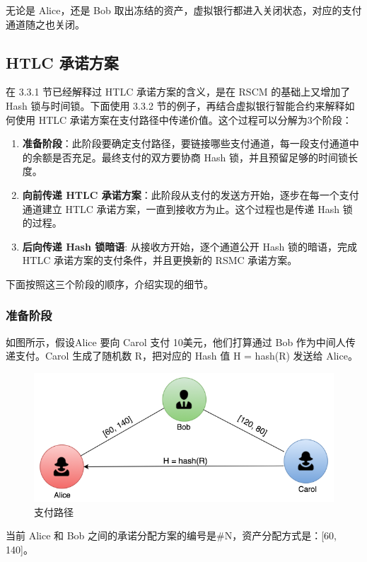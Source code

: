 \begin{appendices}
无论是 Alice，还是 Bob 取出冻结的资产，虚拟银行都进入关闭状态，对应的支付通道随之也关闭。


\subsection{HTLC 承诺方案}
在 3.3.1 节已经解释过 HTLC 承诺方案的含义，是在 RSCM 的基础上又增加了 Hash 锁与时间锁。下面使用 3.3.2 节的例子，再结合虚拟银行智能合约来解释如何使用 HTLC 承诺方案在支付路径中传递价值。这个过程可以分解为3个阶段：
\begin{enumerate}
    \item \textbf{准备阶段}：此阶段要确定支付路径，要链接哪些支付通道，每一段支付通道中的余额是否充足。最终支付的双方要协商 Hash 锁，并且预留足够的时间锁长度。
    \item \textbf{向前传递 HTLC 承诺方案}：此阶段从支付的发送方开始，逐步在每一个支付通道建立 HTLC 承诺方案，一直到接收方为止。这个过程也是传递 Hash 锁的过程。
    \item \textbf{后向传递 Hash 锁暗语}: 从接收方开始，逐个通道公开 Hash 锁的暗语，完成 HTLC 承诺方案的支付条件，并且更换新的 RSMC 承诺方案。
\end{enumerate}

下面按照这三个阶段的顺序，介绍实现的细节。

\subsubsection{准备阶段}

如图所示，假设Alice 要向 Carol 支付 10美元，他们打算通过 Bob 作为中间人传递支付。Carol 生成了随机数 R，把对应的 Hash 值 H = hash(R) 发送给 Alice。

\begin{figure}[h!]
    \centering
    \includegraphics[width=12cm, keepaspectratio]{../images/channels.png}
    \caption{支付路径}
    \label{fig:channels}
\end{figure}


当前 Alice 和 Bob 之间的承诺分配方案的编号是\#N，资产分配方式是：[60, 140]。


\end{appendices}
